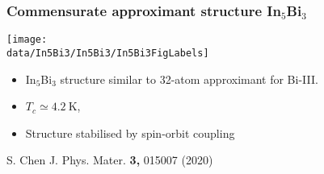 
\begin{frame}[label=In5Bi3]
\frametitle{Commensurate approximant structure In$_5$Bi$_3$}

\centerline{\texttt{[image: \\data/In5Bi3/In5Bi3/In5Bi3FigLabels]}}

\begin{itemize}
\item In$_5$Bi$_3$ structure similar to 32-atom approximant for Bi-III.
\item $T_c \simeq \SI{4.2}{\kelvin}$, 
\item Structure stabilised by spin-orbit coupling

\end{itemize}


\vspace*{\fill}
\centerline{\makebox[\linewidth]{\rule{0.85\textwidth}{0.4pt}}}
\centerline{\scriptsize S. Chen J. Phys. Mater. {\bf 3,} 015007 (2020)}

\end{frame}

